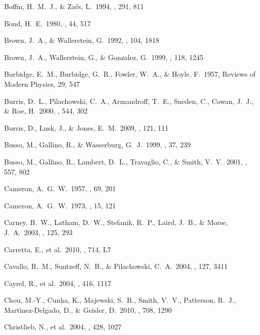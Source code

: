 \documentclass{emulateapj}
\begin{document}
\begin{thebibliography}{}
 Boffin, H.~M.~J., \& 
Za\v{c}s, L.\ 1994, \aap, 291, 811 

 Bond, H.~E.\ 1980, \apjs, 44, 517 

 Brown, J.~A., \& 
Wallerstein, G.\ 1992, \aj, 104, 1818 

 Brown, J.~A., 
Wallerstein, G., \& Gonzalez, G.\ 1999, \aj, 118, 1245 

 Burbidge, E.~M., 
Burbidge, G.~R., Fowler, W.~A., 
\& Hoyle, F.\ 1957, Reviews of Modern Physics, 29, 547 

 Burris, D.~L., 
Pilachowski, C.~A., Armandroff, T.~E., Sneden, C., Cowan, J.~J., 
\& Roe, H.\ 2000, \apj, 544, 302 

 Burris, D., Lusk, J., 
\& Jones, E.~M.\ 2009, \pasp, 121, 111 

 Busso, M., Gallino, R., \& 
Wasserburg, G.~J.\ 1999, \araa, 37, 239 

 Busso, M., Gallino, R., 
Lambert, D.~L., Travaglio, C., \& Smith, V.~V.\ 2001, \apj, 557, 802 

 Cameron, A.~G.~W.\ 1957, 
\pasp, 69, 201 

 Cameron, A.~G.~W.\ 1973, \ssr, 15, 121 

 Carney, B.~W., Latham, 
D.~W., Stefanik, R.~P., Laird, J.~B., \& Morse, J.~A.\ 2003, \aj, 125, 293 

 Carretta, E., et al.\ 
2010, \apjl, 714, L7 

 Cavallo, R.~M., 
Suntzeff, N.~B., \& Pilachowski, C.~A.\ 2004, \aj, 127, 3411 


 Cayrel, R., et al.\ 2004, 
\aap, 416, 1117 

 Chou, M.-Y., Cunha, K., 
Majewski, S.~R., Smith, V.~V., Patterson, R.~J., Mart{\'{\i}}nez-Delgado, 
D., \& Geisler, D.\ 2010, \apj, 708, 1290 

 Christlieb, N., et al.\ 
2004, \aap, 428, 1027 


\end{thebibliography}
\end{document}
